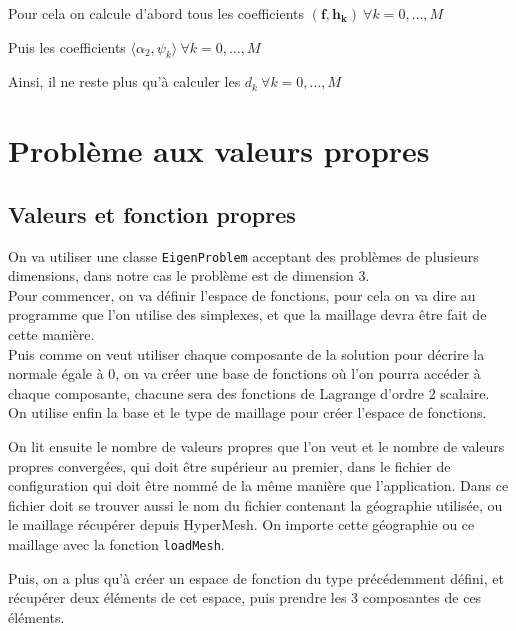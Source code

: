 Pour cela on calcule d'abord tous les coefficients $(\bm{f},\bm{h_k})\ \forall k=0,\dots,M$


Puis les coefficients $\langle\alpha_2,\psi_k\rangle\ \forall k=0,\dots,M$


Ainsi, il ne reste plus qu'à calculer les $d_k\ \forall k=0,\dots,M$


\iffalse

\section{Problème aux valeurs propres}
\subsection{Valeurs et fonction propres}

On va utiliser une classe \texttt{EigenProblem} acceptant des problèmes de plusieurs dimensions, dans notre cas le problème est de dimension 3.\\
Pour commencer, on va définir l'espace de fonctions, pour cela on va dire au programme que l'on utilise des simplexes, et que la maillage devra être fait de cette manière.\\
Puis comme on veut utiliser chaque composante de la solution pour décrire la normale égale à 0, on va créer une base de fonctions où l'on pourra accéder à chaque composante, chacune sera des fonctions de Lagrange d'ordre 2 scalaire.\\
On utilise enfin la base et le type de maillage pour créer l'espace de fonctions.



On lit ensuite le nombre de valeurs propres que l'on veut et le nombre de valeurs propres convergées, qui doit être supérieur au premier, dans le fichier de configuration qui doit être nommé de la même manière que l'application. Dans ce fichier doit se trouver aussi le nom du fichier contenant la géographie utilisée, ou le maillage récupérer depuis HyperMesh. On importe cette géographie ou ce maillage avec la fonction \texttt{loadMesh}.



Puis, on a plus qu'à créer un espace de fonction du type précédemment défini, et récupérer deux éléments de cet espace, puis prendre les 3 composantes de ces éléments.

